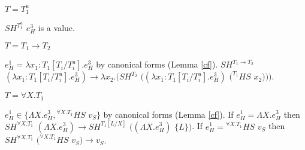 \begin{case}
\begin{subcase}
$T=T_{1}^{a}$

$SH^{T_{1}^{a}}$ $e_{H}^{3}$ is a value.

\end{subcase}

\begin{subcase}

$T=T_{1}\rightarrow T_{2}$

$e_{H}^{1}=\lambda x_{1}:T_{1}[T_{i}/T_{i}^{a}].e_{H}^{3}$ by canonical forms (Lemma \ref{cf}).  $SH^{T_{1}\rightarrow T_{2}}$ $(\lambda x_{1}:T_{1}[T_{i}/T_{i}^{a}].e_{H}^{3})\rightarrow\lambda x_{2}.(SH^{T_{2}}$ $((\lambda x_{1}:T_{1}[T_{i}/T_{i}^{a}].e_{H}^{3})$ $(^{T_{1}}HS$ $x_{2})))$.

\end{subcase}

\begin{subcase}

$T=\forall X.T_{1}$

$e_{H}^{1}\in\lbrace\Lambda X.e_{H}^{3},{^{\forall X.T_{1}}H}S$ $v_{S}\rbrace$ by canonical forms (Lemma \ref{cf}).  If $e_{H}^{1}=\Lambda X.e_{H}^{3}$ then $SH^{\forall X.T_{1}}$ $(\Lambda X.e_{H}^{3})\rightarrow SH^{T_{1}[L/X]}$ $((\Lambda X.e_{H}^{3})$ $\lbrace L\rbrace)$.  If $e_{H}^{1}={^{\forall X.T_{1}}H}S$ $v_{S}$ then $SH^{\forall X.T_{1}}$ $(^{\forall X.T_{1}}HS$ $v_{S})\rightarrow v_{S}$.

\end{subcase}

\end{case}